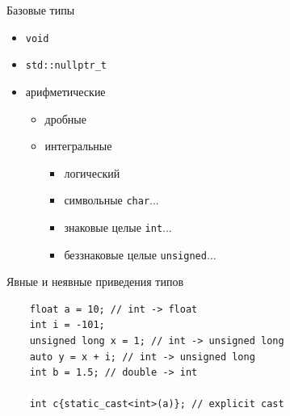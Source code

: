 \documentclass[unknownkeysallowed,xcolor=table]{beamer}
\begin{document}
\begin{frame}{Базовые типы}
  \begin{itemize}
    \item \lstinline{void} \vspace{0.5em}
    \item \lstinline{std::nullptr_t} \vspace{0.5em}
    \item арифметические \vspace{0.5em}
      \begin{itemize}
        \item дробные \vspace{0.5em}
        \item интегральные \vspace{0.5em}
          \begin{itemize}
            \item логический \vspace{0.5em}
            \item символьные \lstinline{char}... \vspace{0.5em}
            \item знаковые целые \lstinline{int}... \vspace{0.5em}
            \item беззнаковые целые \lstinline{unsigned}... \vspace{0.5em}
          \end{itemize}
      \end{itemize}
  \end{itemize}
\end{frame}

\begin{frame}[fragile]{Явные и неявные приведения типов}
  \begin{lstlisting}
    float a = 10; // int -> float
    int i = -101;
    unsigned long x = 1; // int -> unsigned long
    auto y = x + i; // int -> unsigned long
    int b = 1.5; // double -> int

    int c{static_cast<int>(a)}; // explicit cast
  \end{lstlisting}
\end{frame}
\end{document}
